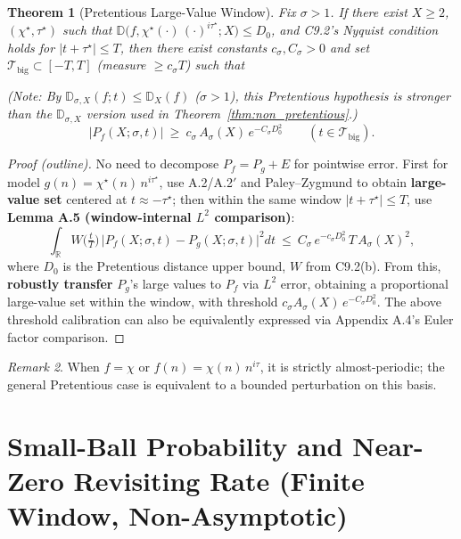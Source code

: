 \documentclass[11pt,a4paper]{article}
\newtheorem{theorem}{Theorem}[section]
\theoremstyle{remark}
\newtheorem{remark}[theorem]{Remark}
\begin{document}
\begin{theorem}[Pretentious Large-Value Window]\label{thm:pretentious_large}
Fix $\sigma>1$. If there exist $X\ge2$, $(\chi^\star,\tau^\star)$ such that $\mathbb{D}\bigl(f,\chi^\star(\cdot)\,(\cdot)^{i\tau^\star};X\bigr)\le D_0$, and C9.2's Nyquist condition holds for $|t+\tau^\star|\le T$, then there exist constants $c_\sigma,C_\sigma>0$ and set $\mathcal{T}_{\mathrm{big}}\subset[-T,T]$ (measure $\ge c_\sigma T$) such that

(Note: By $\mathbb{D}_{\sigma,X}(f;t)\le \mathbb{D}_X(f)$ ($\sigma>1$), this Pretentious hypothesis is stronger than the $\mathbb{D}_{\sigma,X}$ version used in Theorem~\ref{thm:non_pretentious}.)
\begin{equation}
\bigl|P_f(X;\sigma,t)\bigr|\ \ge\ c_\sigma\,A_\sigma(X)\,e^{-C_\sigma D_0^2}\qquad (t\in\mathcal{T}_{\mathrm{big}}).
\end{equation}
\end{theorem}

\begin{proof}[Proof (outline)]
No need to decompose $P_f=P_g+E$ for pointwise error. First for model $g(n)=\chi^\star(n)\,n^{i\tau^\star}$, use A.2/A.2$'$ and Paley--Zygmund to obtain \textbf{large-value set} centered at $t\approx-\tau^\star$; then within the same window $|t+\tau^\star|\le T$, use \textbf{Lemma A.5 (window-internal $L^2$ comparison)}:
\begin{equation*}
\int_{\mathbb{R}} W\!\Big(\tfrac{t}{T}\Big)\,\big|P_f(X;\sigma,t)-P_g(X;\sigma,t)\big|^2 dt\ \le\ C_\sigma\,e^{-c_\sigma D_0^2}\,T\,A_\sigma(X)^2,
\end{equation*}
where $D_0$ is the Pretentious distance upper bound, $W$ from C9.2(b). From this, \textbf{robustly transfer} $P_g$'s large values to $P_f$ via $L^2$ error, obtaining a proportional large-value set within the window, with threshold $c_\sigma A_\sigma(X)\,e^{-C_\sigma D_0^2}$. The above threshold calibration can also be equivalently expressed via Appendix A.4's Euler factor comparison.
\end{proof}

\begin{remark}
When $f=\chi$ or $f(n)=\chi(n)\,n^{i\tau}$, it is strictly almost-periodic; the general Pretentious case is equivalent to a bounded perturbation on this basis.
\end{remark}

\section{Small-Ball Probability and Near-Zero Revisiting Rate (Finite Window, Non-Asymptotic)}
\end{document}
